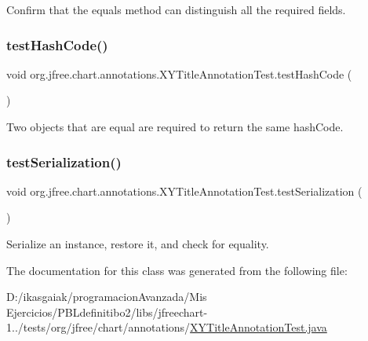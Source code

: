 Confirm that the equals method can distinguish all the required fields. \mbox{\label{classorg_1_1jfree_1_1chart_1_1annotations_1_1_x_y_title_annotation_test_afe525cfbf5249bf24114537f969b74bf}} 
\subsubsection{\texorpdfstring{test\+Hash\+Code()}{testHashCode()}}
{\footnotesize\ttfamily void org.\+jfree.\+chart.\+annotations.\+X\+Y\+Title\+Annotation\+Test.\+test\+Hash\+Code (\begin{DoxyParamCaption}{ }\end{DoxyParamCaption})}

Two objects that are equal are required to return the same hash\+Code. \mbox{\label{classorg_1_1jfree_1_1chart_1_1annotations_1_1_x_y_title_annotation_test_ac45e1d4075c322480656d0dc2dd2f4c2}} 
\subsubsection{\texorpdfstring{test\+Serialization()}{testSerialization()}}
{\footnotesize\ttfamily void org.\+jfree.\+chart.\+annotations.\+X\+Y\+Title\+Annotation\+Test.\+test\+Serialization (\begin{DoxyParamCaption}{ }\end{DoxyParamCaption})}

Serialize an instance, restore it, and check for equality. 

The documentation for this class was generated from the following file\+:\begin{DoxyCompactItemize}
\item 
D\+:/ikasgaiak/programacion\+Avanzada/\+Mis Ejercicios/\+P\+B\+Ldefinitibo2/libs/jfreechart-\/1../tests/org/jfree/chart/annotations/\mbox{\hyperlink{_x_y_title_annotation_test_8java}{X\+Y\+Title\+Annotation\+Test.\+java}}\end{DoxyCompactItemize}
